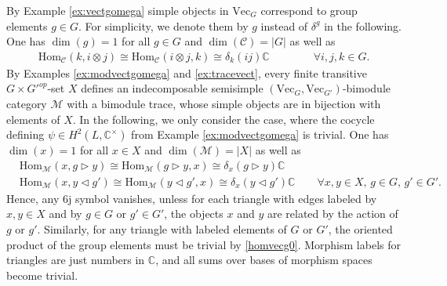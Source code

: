 \documentclass[1.5pt, a4paper]{article}
\newcommand{\C}{\mathbb{C}}
\newcommand{\mac}{\mathcal C}
\newcommand{\mam}{\mathcal M}
\newcommand{\Hom}{\mathrm{Hom}}
\newcommand{\oo}[0]{\otimes}
\begin{document}
By Example \ref{ex:vectgomega} simple objects in $\mathrm{Vec}_G$ correspond to group elements $g\in G$. For simplicity, we denote them by $g$ instead of $\delta^g$ in the following. One has $\dim(g)=1$ for all $g\in G$ and $\dim(\mac)=|G|$ as well as
\begin{align}\label{homvecg0}
 \Hom_\mac(k, i\oo j)\cong \Hom_\mac(i\oo j, k)\cong \delta_k(ij)\C\qquad\qquad\forall i,j,k\in G.
 \end{align} 
By Examples \ref{ex:modvectgomega} and \ref{ex:tracevect}, every finite transitive $G\times G'^{op}$-set $X$ defines an  indecomposable  semisimple $(\mathrm{Vec}_G, \mathrm{Vec}_{G'})$-bimodule category $\mam$ with a bimodule trace, whose simple objects are in bijection  with elements of $X$. In the following, we only consider the case, where the cocycle defining $\psi \in H^2(L,\C^{\times})$ from Example  \ref{ex:modvectgomega} is trivial.  One  has $\dim(x)=1$ for all $x\in X$ and $\dim(\mam)=|X|$ as well as  
\begin{align}\label{eq:homvecg}
&\Hom_\mam(x, g\rhd y)\cong \Hom_\mam (g\rhd y, x) \cong \delta_x(g\rhd y) \C\\  
&\Hom_\mam(x,  y\lhd g')\cong \Hom_\mam (y\lhd g', x) \cong \delta_x( y\lhd g') \C \qquad \forall x,y\in X,\, g\in G, \, g'\in G'.\nonumber
\end{align} 
Hence, any 6j symbol vanishes, unless for each triangle with edges labeled by  $x, y\in X$ and by $g\in G$ or $g'\in G'$, the objects $x$ and $y$ are related by the action of $g$ or $g'$. Similarly,  for any triangle with labeled  elements of $G$ or $G'$, the oriented product of the group elements must be trivial by \eqref{homvecg0}. 
Morphism labels for triangles are just numbers in $\C$, and all sums over bases of morphism spaces become trivial.
\end{document}
